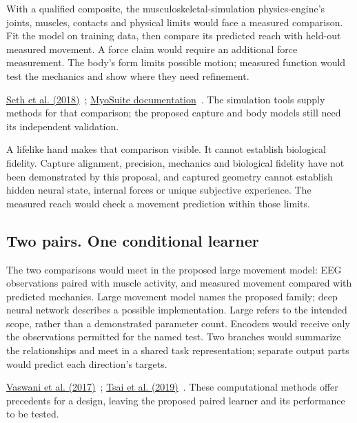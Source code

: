 With a qualified composite, the musculoskeletal-simulation physics-engine's
joints, muscles, contacts and physical limits would face a measured comparison.
Fit the model on training data, then compare its predicted reach with
held-out measured movement. A force claim would require an additional force
measurement. The body's form limits possible motion; measured function would
test the mechanics and show where they need refinement.
\par\noindent \href{https://journals.plos.org/ploscompbiol/article?id=10.1371/journal.pcbi.1006223}{Seth et al. (2018)}~\cite{opensim2018}; \href{https://myosuite.readthedocs.io/en/latest/}{MyoSuite documentation}~\cite{myosuiteDocsUndated}. The simulation tools supply methods for that comparison; the proposed capture and body models still need its independent validation.

A lifelike hand makes that comparison visible. It cannot establish biological
fidelity. Capture alignment, precision, mechanics and biological fidelity have
not been demonstrated by this proposal, and captured geometry cannot establish
hidden neural state, internal forces or unique subjective experience. The
measured reach would check a movement prediction within those limits.

\subsection{Two pairs. One conditional learner}
The two comparisons would meet in the proposed large movement model: EEG
observations paired with muscle activity, and measured movement compared
with predicted mechanics. Large movement model names the proposed family;
deep neural network describes a possible implementation. Large refers to
the intended scope, rather than a demonstrated parameter count. Encoders
would receive only the observations permitted for the named test. Two
branches would summarize the relationships and meet in a shared task
representation; separate output parts would predict each direction's targets.
\par\noindent \href{https://arxiv.org/html/1706.03762v7}{Vaswani et al. (2017)}~\cite{vaswani2017}; \href{https://aclanthology.org/P19-1656/}{Tsai et al. (2019)}~\cite{tsai2019}. These computational methods offer precedents for a design, leaving the proposed paired learner and its performance to be tested.

